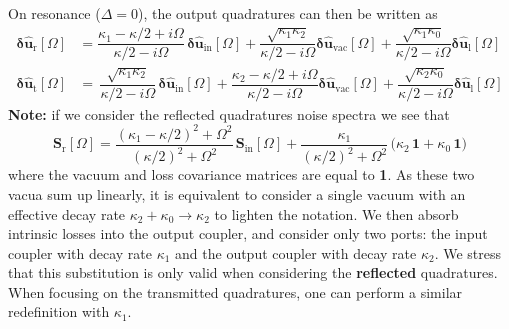 On resonance ($\Delta=0$), the output quadratures can then be written as 
\begin{equation}
  \begin{split}
  \mathbf{\delta \hat{u}_{\mathrm{r}}}[\Omega]   &= \dfrac{\kappa_1-\kappa/2+i\Omega}{\kappa/2-i\Omega}  \,  \mathbf{\delta \hat{u}_{\mathrm{in}}}[\Omega]   +   \dfrac{\sqrt{\kappa_1 \kappa_2} }{\kappa/2-i\Omega}  \mathbf{\delta \hat{u}_{\mathrm{vac}}}[\Omega] + \dfrac{\sqrt{\kappa_1 \kappa_0} }{\kappa/2-i\Omega}  \mathbf{\delta \hat{u}_{\mathrm{l}}}[\Omega]  \\
  \mathbf{\delta \hat{u}_{\mathrm{t}}}[\Omega]   &= \, \dfrac{ \sqrt{\kappa_1 \kappa_2}}{\kappa/2-i\Omega}  \, \mathbf{\delta \hat{u}_{\mathrm{in}}}[\Omega]   +  \dfrac{\kappa_2-\kappa/2+i\Omega}{\kappa/2-i\Omega}   \mathbf{\delta \hat{u}_{\mathrm{vac}}}[\Omega]   + \dfrac{\sqrt{\kappa_2 \kappa_0} }{\kappa/2-i\Omega}  \mathbf{\delta \hat{u}_{\mathrm{l}}}[\Omega] 
  \end{split}
\end{equation}
\textbf{Note: } if we consider the reflected quadratures noise spectra we see that 
\begin{equation}
   \mathbf{S}_{\mathrm{r}}[\Omega] =\frac{(\kappa_1-\kappa/2)^2+\Omega^2}{(\kappa/2)^2+\Omega^2}\,\mathbf{S}_{\mathrm{in}}[\Omega]+\frac{\kappa_1}{(\kappa/2)^2+\Omega^2}\,\Big(\kappa_2 \, \mathbf{1}+\kappa_0 \,\mathbf{1}\Big) 
\end{equation}
where the vacuum and loss covariance matrices are equal to \textbf{1}. As these two vacua sum up linearly, it is equivalent to consider a single vacuum with an effective decay rate $\kappa_2 + \kappa_0 \rightarrow \kappa_2$ to lighten the notation. We then absorb intrinsic losses into the output coupler, and consider only two ports: the input coupler with decay rate $\kappa_1$ and the output coupler with decay rate $\kappa_2$. We stress that this substitution is only valid when considering the \textbf{reflected} quadratures. When focusing on the transmitted quadratures, one can perform a similar redefinition with $\kappa_1$. 
